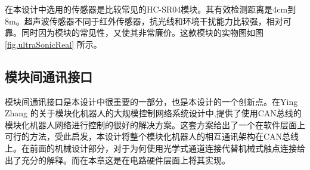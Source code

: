 在本设计中选用的传感器是比较常见的HC-SR04模块。其有效检测距离是4cm到8m。超声波传感器不同于红外传感器，抗光线和环境干扰能力比较强，相对可靠。同时因为模块的常见性，又使其非常廉价。这款模块的实物图如图\ref{fig.ultraSonicReal} 所示。 \\
\begin{figure}[!htp]
  \centering
  \hspace{1in}
\end{figure}
\subsection{模块间通讯接口}
模块间通讯接口是本设计中很重要的一部分，也是本设计的一个创新点。在Ying Zhang 的关于模块化机器人的大规模控制网络系统设计中,提供了使用CAN总线的模块化机器人网络进行控制的很好的解决方案。这套方案给出了一个在软件层面上可行的方法，受此启发，本设计将整个模块化机器人的相互通讯架构在CAN总线上。在前面的机械设计部分，对于为何使用光学式通道连接代替机械式触点连接给出了充分的解释。而在本章这是在电路硬件层面上将其实现。

